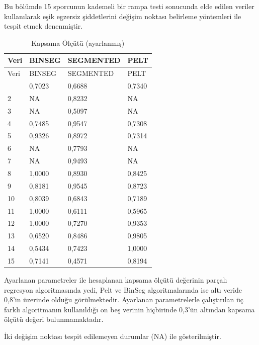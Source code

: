\documentclass[12pt,twoside]{deuthesis}
\begin{document}
Bu bölümde 15 sporcunun kademeli bir rampa testi sonucunda elde edilen veriler kullanılarak eşik egzersiz şiddetlerini değişim noktası belirleme yöntemleri ile tespit etmek denenmiştir.

\begin{longtable}[]{@{}llll@{}}
\caption{\label{tab:nvar6} Kapsama Ölçütü (ayarlanmış)}\tabularnewline
\toprule\noalign{}
Veri & BINSEG & SEGMENTED & PELT \\
\midrule\noalign{}
\endfirsthead
\toprule\noalign{}
Veri & BINSEG & SEGMENTED & PELT \\
\midrule\noalign{}
\endhead
\bottomrule\noalign{}
\endlastfoot
1 & 0,7023 & 0,6688 & 0,7340 \\
2 & NA & 0,8232 & NA \\
3 & NA & 0,5097 & NA \\
4 & 0,7485 & 0,9547 & 0,7308 \\
5 & 0,9326 & 0,8972 & 0,7314 \\
6 & NA & 0,7793 & NA \\
7 & NA & 0,9493 & NA \\
8 & 1,0000 & 0,8930 & 0,8425 \\
9 & 0,8181 & 0,9545 & 0,8723 \\
10 & 0,8039 & 0,6843 & 0,7189 \\
11 & 1,0000 & 0,6111 & 0,5965 \\
12 & 1,0000 & 0,7270 & 0,9353 \\
13 & 0,6520 & 0,8486 & 0,9805 \\
14 & 0,5434 & 0,7423 & 1,0000 \\
15 & 0,7141 & 0,4571 & 0,8194 \\
\end{longtable}

Ayarlanan parametreler ile hesaplanan kapsama ölçütü değerinin parçalı regresyon algoritmasında yedi, Pelt ve BinSeg algoritmalarında ise altı veride 0,8'in üzerinde olduğu görülmektedir.
Ayarlanan parametrelerle çalıştırılan üç farklı algoritmanın kullanıldığı on beş verinin hiçbirinde 0,3'ün altından kapsama ölçütü değeri bulunmamaktadır.

İki değişim noktası tespit edilemeyen durumlar (NA) ile gösterilmiştir.
\end{document}
